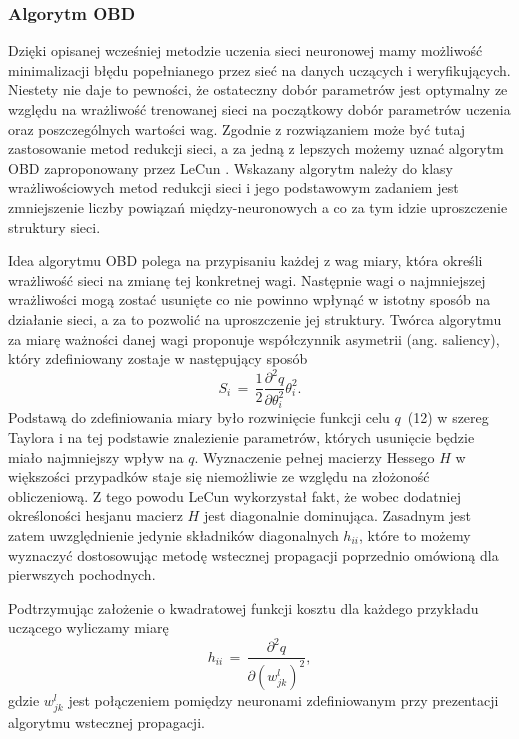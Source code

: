 \subsubsection{Algorytm OBD}
Dzięki opisanej wcześniej metodzie uczenia sieci neuronowej mamy możliwość minimalizacji błędu popełnianego przez sieć na danych uczących i weryfikujących. Niestety nie daje to pewności, że ostateczny dobór parametrów jest optymalny ze względu na wrażliwość trenowanej sieci na początkowy dobór parametrów uczenia oraz poszczególnych wartości wag. Zgodnie z \cite{osowski2013} rozwiązaniem może być tutaj zastosowanie metod redukcji sieci, a za jedną z lepszych możemy uznać algorytm OBD zaproponowany przez LeCun \cite{lecun1989}. Wskazany algorytm należy do klasy wrażliwościowych metod redukcji sieci i jego podstawowym zadaniem jest zmniejszenie liczby powiązań między-neuronowych a co za tym idzie uproszczenie struktury sieci. 
\par Idea algorytmu OBD polega na przypisaniu każdej z wag miary, która określi wrażliwość sieci na zmianę tej konkretnej wagi. Następnie wagi o najmniejszej wrażliwości mogą zostać usunięte co nie powinno wpłynąć w istotny sposób na działanie sieci, a za to pozwolić na uproszczenie jej struktury. Twórca algorytmu za miarę ważności danej wagi proponuje współczynnik asymetrii (ang. saliency), który zdefiniowany zostaje w następujący sposób
\begin{equation}
S_i \, = \, \frac{1}{2} \frac{\partial^2q}{\partial \theta_i^2} \theta_i^2 .
\end{equation} 
Podstawą do zdefiniowania miary było rozwinięcie funkcji celu \(q\)~(12) w szereg Taylora i na tej podstawie znalezienie parametrów, których usunięcie będzie miało najmniejszy wpływ na  \(q\). Wyznaczenie pełnej macierzy Hessego \(H\) w większości przypadków staje się niemożliwie ze względu na złożoność obliczeniową. Z tego powodu LeCun wykorzystał fakt, że wobec dodatniej określoności hesjanu macierz \(H\) jest diagonalnie dominująca. Zasadnym jest zatem uwzględnienie jedynie składników diagonalnych \( h_{ii} \), które to możemy wyznaczyć dostosowując metodę wstecznej propagacji poprzednio omówioną dla pierwszych pochodnych. 
\par Podtrzymując założenie o kwadratowej funkcji kosztu dla każdego przykładu uczącego wyliczamy miarę
\begin{equation}
h_{ii} \, = \, \frac{\partial^2q}{\partial (w_{jk}^l)^2}, 
\end{equation}  
gdzie \( w_{jk}^l \) jest połączeniem pomiędzy neuronami zdefiniowanym przy prezentacji algorytmu wstecznej propagacji.
